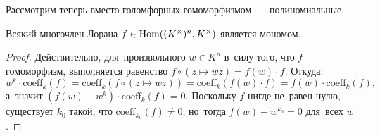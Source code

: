 \documentclass{article}
\begin{document}
Рассмотрим теперь вместо голомфорных гомоморфизмом~— полиномиальные.
\begin{lemma*}
    Всякий многочлен Лорана $f \in \mathrm{Hom}((K^\times)^n, K^\times)$ является мономом.
\end{lemma*}

\begin{proof}
    Действительно, для~произвольного $w \in K^n$ в~силу того, что $f$~— гомоморфизм,
    выполняется равенство $f \circ (z \mapsto wz) = f(w) \cdot f$. Откуда:
    $$
        w^k \cdot \mathrm{coeff}_k(f) = \mathrm{coeff}_k(f \circ (z \mapsto wz)) = \mathrm{coeff}_k(f(w) \cdot f) = f(w) \cdot \mathrm{coeff}_k(f),
    $$
    а~значит $(f(w) - w^k) \cdot \mathrm{coeff}_k(f) = 0$.
    Поскольку $f$ нигде не~равен нулю, существует $k_0$ такой, что $\mathrm{coeff}_{k_0}(f) \neq 0$;
    но~тогда $f(w) - w^{k_0} = 0$ для~всех $w$.
\end{proof}
\end{document}
